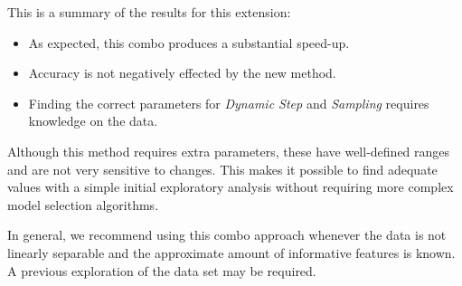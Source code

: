 This is a summary of the results for this extension:

\begin{itemize}
    \item As expected, this combo produces a substantial speed-up.
    \item Accuracy is not negatively effected by the new method.
    \item Finding the correct parameters for \emph{Dynamic Step} and \emph{Sampling} requires knowl\-edge on the data. 
\end{itemize}

Although this method requires extra parameters, these have well-defined ranges and are not very sensitive to changes. This makes it possible to find adequate values with a simple initial exploratory analysis without requiring more complex model selection algorithms. 

In general, we recommend using this combo approach whenever the data is not linearly separable and the approximate amount of informative features is known. A previous exploration of the data set may be required.
